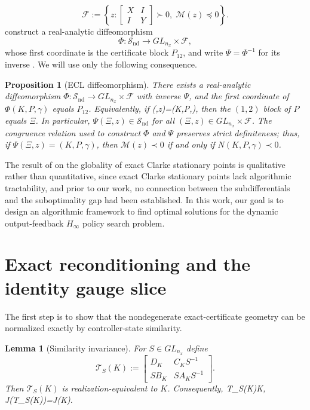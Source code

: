\documentclass[letterpaper,10pt,conference]{ieeeconf}
\def\[#1\]{\begin{align*}#1\end{align*}}
\providecommand{\cC}{\mathcal{C}}
\providecommand{\cF}{\mathcal{F}}
\providecommand{\cS}{\mathcal{S}}
\providecommand{\cM}{\mathcal{M}}
\renewcommand{\^}[1]{^{(#1)}}
\newtheorem{lemma}[theorem]{Lemma}
\newtheorem{proposition}[theorem]{Proposition}
\begin{document}
\begin{equation}\label{eq:F-def}
\cF:=\left\{ z:
\begin{bmatrix}X&I\\I&Y\end{bmatrix}\succ 0,
\; \cM(z)\preceq 0
\right\}.
\end{equation}
\citet{tang2023global} construct a real-analytic diffeomorphism
\begin{equation}\label{eq:phi}
\Phi:\cS_{\mathrm{nd}}\to GL_{n_x}\times \cF,
\end{equation}
whose first coordinate is the certificate block $P_{12}$, and write $\Psi=\Phi^{-1}$ for its inverse \citep[Proposition~2]{tang2023global}. We will use only the following consequence.

\begin{proposition}[ECL diffeomorphism]\label{prop:TZ-ECL}
There exists a real-analytic diffeomorphism $\Phi:\cS_{\mathrm{nd}}\to GL_{n_x}\times \cF$ with inverse $\Psi$, and the first coordinate of $\Phi(K,P,\gamma)$ equals $P_{12}$. Equivalently, if
\[
\Psi(\Xi,z)=(K,P,\gamma),
\]
then the $(1,2)$ block of $P$ equals $\Xi$. In particular, $\Psi(\Xi,z)\in\cS_{\mathrm{nd}}$ for all $(\Xi,z)\in GL_{n_x}\times\cF$. The congruence relation used to construct $\Phi$ and $\Psi$ preserves strict definiteness; thus, if $\Psi(\Xi,z)=(K,P,\gamma)$, then $\cM(z)\prec0$ if and only if $N(K,P,\gamma)\prec0$.
\end{proposition}

The result of \cite{tang2023global} on the globality of exact Clarke stationary points is qualitative rather than quantitative, since exact Clarke stationary points lack algorithmic tractability, and prior to our work, no connection between the subdifferentials and the suboptimality gap had been established. In this work, our goal is to design an algorithmic framework to find optimal solutions for the dynamic output-feedback $H_\infty$ policy search problem.

\section{Exact reconditioning and the identity gauge slice}\label{sec:reconditioning}
The first step is to show that the nondegenerate exact-certificate geometry can be normalized exactly by controller-state similarity.

\begin{lemma}[Similarity invariance]\label{lem:similarity}
For $S\in GL_{n_x}$ define
\begin{equation}\label{eq:T_S}
\mathcal T_S(K):=
\begin{bmatrix}
D_K & C_K S^{-1}\\
S B_K & S A_K S^{-1}
\end{bmatrix}.
\end{equation}
Then $\mathcal T_S(K)$ is realization-equivalent to $K$. Consequently,
\[
\mathcal T_S(K)\in\cC \iff K\in\cC,
\qquad
J\bigl(\mathcal T_S(K)\bigr)=J(K).
\]
\end{lemma}
\end{document}
